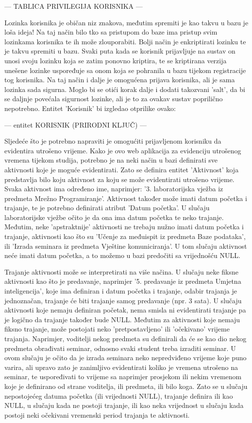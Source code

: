 \documentclass[times, utf8, zavrsni]{fer}
\begin{document}
--- TABLICA PRIVILEGIJA KORISNIKA ---

Lozinka korisnika je običan niz znakova, međutim spremiti je kao takvu u bazu je loša ideja! Na taj način bilo tko sa pristupom do baze ima pristup svim lozinkama korisnika te ih može zlouporabiti. Bolji način je enkriptirati lozinku te je takvu spremiti u bazu. Svaki puta kada se korisnik prijavljuje na sustav on unosi svoju lozinku koja se zatim ponovno kriptira, te se kriptirana verzija unešene lozinke uspoređuje sa onom koja se pohranila u bazu tijekom registracije tog korisnika. Na taj način i dalje je omogućena prijava korisnika, ali je sama lozinka sada sigurna. Moglo bi se otići korak dalje i dodati takozvani 'salt', da bi se daljnje povećala sigurnost lozinke, ali je to za ovakav sustav poprilično nepotrebno. Entitet 'Korisnik' bi izgledao otprilike ovako:

--- entitet KORISNIK (PRIRODNI KLJUČ) ---

Sljedeće što je potrebno napraviti je omogućiti prijavljenom korisniku da evidentira utrošeno vrijeme. Kako je ovo web aplikacija za evidenciju utrošenog vremena tijekom studija, potrebno je na neki način u bazi definirati sve aktivnosti koje je moguće evidentirati. Zato se definira entitet 'Aktivnost' koja predstavlja bilo koju aktivnost za koju se može evidentirati utrošeno vrijeme.
Svaka aktivnost ima određeno ime, naprimjer: '3. laboratorijska vježba iz predmeta Mrežno Programiranje'. Aktivnost također može imati datum početka i trajanje, te je potrebno definirati atribut 'Datum početka'. U slučaju laboratorijske vježbe očito je da ona ima datum početka te neko trajanje. Međutim, neke 'apstraktnije' aktivnosti ne trebaju nužno imati datum početka i trajanje, aktivnosti kao što su 'Učenje za međuispit iz predmeta Baze podataka', ili 'Izrada seminara iz predmeta Vještine komuniciranja'. U tom slučaju aktivnost neće imati datum početka, a to možemo u bazi predočiti sa vrijednošću NULL.

Trajanje aktivnosti može se interpretirati na više načina. U slučaju neke fiksne aktivnosti kao što je predavanje, naprimjer '5. predavanje iz predmeta Umjetna inteligencija', koje ima definiran i datum početka i trajanje, odabir trajanja je jednoznačan, trajanje će biti trajanje samog predavanje (npr. 3 sata). U slučaju aktivnosti koje nemaju definiran početak, nema smisla ni evidentirati trajanje pa je logično da trajanje također bude NULL. Međutim za aktivnosti koje nemaju fiksno trajanje, može postojati neko 'pretpostavljeno' ili 'očekivano' vrijeme trajanja. Naprimjer, voditelji nekog predmeta su definirali da će se kao dio nekog predmeta obrađivati seminar, odnosno svaki student treba izraditi seminar. U ovom slučaju je očito da je izrada seminara neko nepredviđeno vrijeme koje puno varira, ali upravo zato je zanimljivo evidentirati koliko je vremena utrošeno na seminar, te uspoređivati to vrijeme sa naprimjer prosjekom ili nekim vremenom koje je definirano od strane voditelja, ili predmeta, ili bilo koga. Zato se u slučaju nepostojećeg datuma početka (ili vrijednosti NULL), trajanje definira ili kao NULL, u slučaju kada ne postoji trajanje, ili kao neka vrijednost u slučaju kada postoji neki očekivani vremenski period trajanja te aktivnosti.
\end{document}
